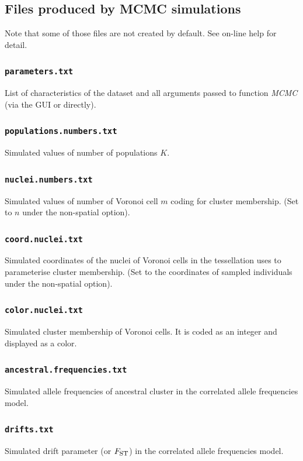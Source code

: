 \documentclass[a4paper,10pt]{article}
\newcommand{\Fst}{F_{\mbox{\footnotesize ST}}}
\begin{document}
\subsection{Files produced by MCMC simulations}

Note that some of those files are not created by default. See on-line help for detail.

\subsubsection{\texttt{parameters.txt}}
List of characteristics of the dataset and all arguments passed to function {\it MCMC} (via the GUI or directly).

\subsubsection{\texttt{populations.numbers.txt}}
Simulated values of number of populations $K$.

\subsubsection{\texttt{nuclei.numbers.txt}}
Simulated values of number of Voronoi cell $m$ coding for cluster membership. 
(Set to $n$ under the non-spatial option).


\subsubsection{\texttt{coord.nuclei.txt}}
Simulated coordinates of the nuclei of Voronoi cells in the tessellation uses to parameterise  cluster membership. 
(Set to the coordinates of sampled individuals under the non-spatial option).

\subsubsection{\texttt{color.nuclei.txt}}
Simulated cluster membership of  Voronoi cells. It is coded as an integer and displayed as a color. 


\subsubsection{\texttt{ancestral.frequencies.txt}}
Simulated allele frequencies of ancestral cluster in the correlated allele frequencies model. 

\subsubsection{\texttt{drifts.txt}}
Simulated drift parameter (or  $\Fst$) in the correlated allele frequencies model. 
\end{document}
